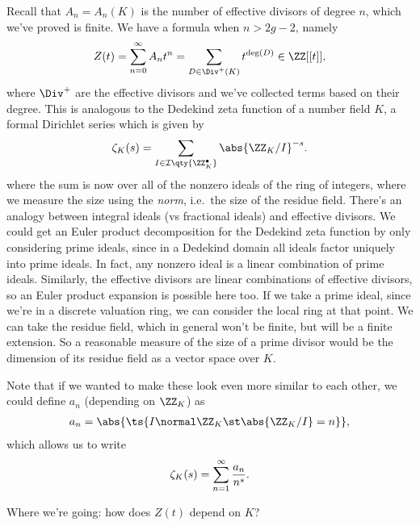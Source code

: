 Recall that \(A_n = A_n(K)\) is the number of effective divisors of
degree \(n\), which we've proved is finite. We have a formula when
\(n> 2g-2\), namely
\begin{align*}  
Z(t) = \sum_{n=0}^\infty A_n t^n = \sum_{D\in \Div^+(K)} t^{\deg(D)} \in \ZZ[[t]]
,\end{align*} where \(\Div^+\) are the effective divisors and we've
collected terms based on their degree. This is analogous to the Dedekind
zeta function of a number field \(K\), a formal Dirichlet series which
is given by
\begin{align*}  
\zeta_K(s) = \sum_{I \in \mathcal{I}\qty{\ZZ_K^\bullet}} \abs{ \ZZ_K / I}^{-s}
.\end{align*} where the sum is now over all of the nonzero ideals of the
ring of integers, where we measure the size using the \emph{norm},
i.e.~the size of the residue field. There's an analogy between integral
ideals (vs fractional ideals) and effective divisors. We could get an
Euler product decomposition for the Dedekind zeta function by only
considering prime ideals, since in a Dedekind domain all ideals factor
uniquely into prime ideals. In fact, any nonzero ideal is a linear
combination of prime ideals. Similarly, the effective divisors are
linear combinations of effective divisors, so an Euler product expansion
is possible here too. If we take a prime ideal, since we're in a
discrete valuation ring, we can consider the local ring at that point.
We can take the residue field, which in general won't be finite, but
will be a finite extension. So a reasonable measure of the size of a
prime divisor would be the dimension of its residue field as a vector
space over \(K\).

Note that if we wanted to make these look even more similar to each
other, we could define \(a_n\) (depending on \(\ZZ_K\)) as
\begin{align*}
a_n = \abs{\ts{I \normal \ZZ_K \st \abs{\ZZ_K/I} = n}}
,\end{align*} which allows us to write
\begin{align*}  
\zeta_K(s) = \sum_{n=1}^\infty {a_n \over n^s}
.\end{align*}

\begin{question}

Where we're going: how does \(Z(t)\) depend on \(K\)?

\end{question}

